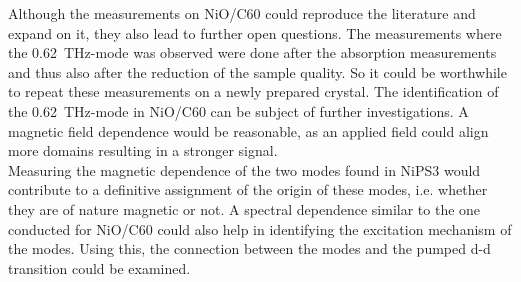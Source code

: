 Although the measurements on NiO/C60 could reproduce the literature and expand on it, they also lead to further open questions.
The measurements where the \qty{0.62}{THz}-mode was observed were done after the absorption measurements and thus also after the reduction of the sample quality.
So it could be worthwhile to repeat these measurements on a newly prepared crystal.
The identification of the \qty{0.62}{THz}-mode in NiO/C60 can be subject of further investigations.
A magnetic field dependence would be reasonable, as an applied field could align more domains resulting in a stronger signal. \\
Measuring the magnetic dependence of the two modes found in NiPS3 would contribute to a definitive assignment of the origin of these modes, i.e. whether they are of nature magnetic or not.
A spectral dependence similar to the one conducted for NiO/C60 could also help in identifying the excitation mechanism of the modes.
Using this, the connection between the modes and the pumped d-d transition could be examined.




